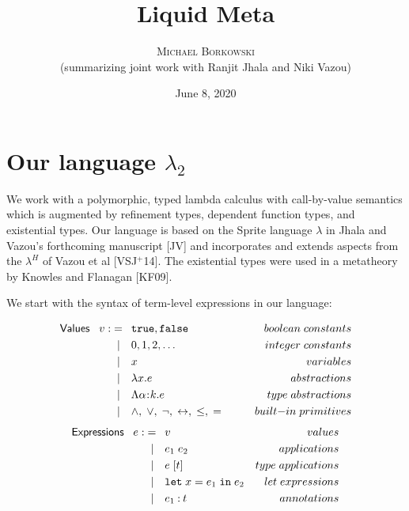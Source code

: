 \documentclass[11pt]{article}
\newcommand{\bind}{\hspace{0.05em}{:}\hspace{0.05em}} %
\newcommand{\col}{\mathbin{:}}       %
\begin{document}
\title{Liquid Meta}
\author{\textsc{Michael Borkowski} \\ (summarizing joint work with {\sc Ranjit Jhala} and {\sc Niki Vazou})}
\date{June 8, 2020}

\maketitle
\thispagestyle{empty}

\section{Our language $\lambda_2$}

We work with a polymorphic, typed lambda calculus with call-by-value semantics which is augmented by refinement types, dependent function types, and existential types. Our language is based on the Sprite language $\lambda$ in Jhala and Vazou's forthcoming manuscript [JV] and incorporates and extends aspects from the $\lambda^H$ of Vazou et al [VSJ$^+$14]. The existential types were used in a metatheory by Knowles and Flanagan [KF09].

We start with the syntax of term-level expressions in our language:

\begin{align*}
{\sf Values} \;\;\; v :&=\;\: {\tt true}, {\tt false}
                         {\kern 5em}& boolean\; constants\\
                   &\;\;|\quad 0, 1, 2, \ldots 
                         & integer \; constants\\
                   &\;\;|\quad x & variables\\
                   &\;\;|\quad \lambda x . e
                         & abstractions \\
                   &\;\;|\quad \Lambda \alpha\bind k .e
                         & type\; abstractions\\
                   &\;\;|\quad \wedge, \; \vee, \;\neg,\; 
                         \leftrightarrow,\; \leq,\; =                     
                         & built{\rm -}in\; primitives 
\end{align*}
\begin{align*}
{\sf Expressions} \;\;\; e :&=\;\: v {\kern 5 em}& values \\
	                &\;\;|\quad e_1\; e_2 & applications \\
	                &\;\;|\quad e\; [t] & type\; applications\\
	                &\;\;|\quad {\tt let}\; x = e_1
	                      \; {\tt in} \; e_2 & let\; expressions\\
	                &\;\;|\quad e_1 \col t & annotations \\
\end{align*}
\end{document}
